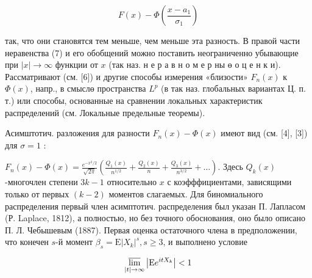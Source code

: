 \documentclass[10pt]{article}
\begin{document}
\[

F(x)-\Phi\left(\frac{x-a_{1}}{\sigma_{1}}\right)

\]



так, что они становятся тем меньше, чем меньше эта разность. В правой части неравенства (7) и его обобщений можно поставить неограниченно убывающие при $|x| \rightarrow \infty$ функции от $x$ (так наз. н е р а в н о м е р ны $ө$ о ц е н к и). Рассматривают (см. [6]) и другие способы измерения «близости» $F_{n}(x)$ к $\Phi(x)$, напр., в смыслө пространства $L^{p}$ (в так наз. глобальных вариантах Ц. п. т.) или способы, основанные на сравнении локальных характеристик распределений (см. Локальные предельные теоремы).



Асимштотич. разложения для разности $F_{n}(x)-\Phi(x)$ имеют вид (см. [4], [3]) для $\sigma=1$ :



$F_{n}(x)-\Phi(x)=\frac{e^{-x^{2} / 2}}{\sqrt{2 \pi}}\left(\frac{Q_{1}(x)}{n^{1 / 2}}+\frac{Q_{2}(x)}{n}+\frac{Q_{3}(x)}{n^{3 / 2}}+\ldots\right)$. Здесь $Q_{k}(x)$-многочлен степени $3 k-1$ относительно $x$ с коэфффициентами, зависящими только от первых $(k-2)$ моментов слагаемых. Для биномиального распределения первый член асимптотич. распределения был указан П. Лапласом (Р. Laplace, 1812), а полностью, но без точного обоснования, оно было описано П. Л. Чебышевым (1887). Первая оценка остаточного члена в предположении, что конечен $s$-й момент $\beta_{s}=\mathrm{E}\left|X_{k}\right|^{s}, s \geqslant 3$, и выполнено условие



\[

\varlimsup_{|t| \rightarrow \infty}\left|\mathrm{E} e^{i t X_{k}}\right|<1

\]
\end{document}
